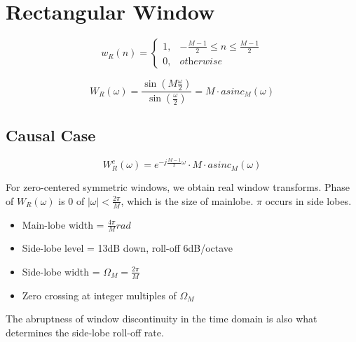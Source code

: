\documentclass[11pt]{article}
\begin{document}
\section*{Rectangular Window}

\begin{equation*}
w_R(n) =
\begin{cases}
1, &-\frac{M-1}{2} \leq n \leq \frac{M-1}{2} \\
0, &\textit{otherwise}
\end{cases}
\end{equation*}

\begin{equation*}
W_R(\omega) = \frac{\sin(M\frac{\omega}{2})}{\sin(\frac{\omega}{2})} = M \cdot asinc_M(\omega)
\end{equation*}

\subsection*{Causal Case}

\begin{equation*}
W^c_R(\omega) = e ^ {-j\frac{M-1}{2}\omega} \cdot M \cdot asinc_M(\omega)
\end{equation*}

For zero-centered symmetric windows, we obtain real window transforms. Phase of $W_R(\omega)$ is 0 of $|\omega| < \frac{2\pi}{M}$, which is the size of mainlobe. $\pi$ occurs in side lobes.

\begin{itemize}
\item Main-lobe width = $\frac{4\pi}{M} rad$
\item Side-lobe level = 13dB down, roll-off 6dB/octave
\item Side-lobe width = $\Omega_M = \frac{2\pi}{M}$
\item Zero crossing at integer multiples of $\Omega_M$
\end{itemize}

The abruptness of window discontinuity in the time domain is also what determines the side-lobe roll-off rate.
\end{document}
